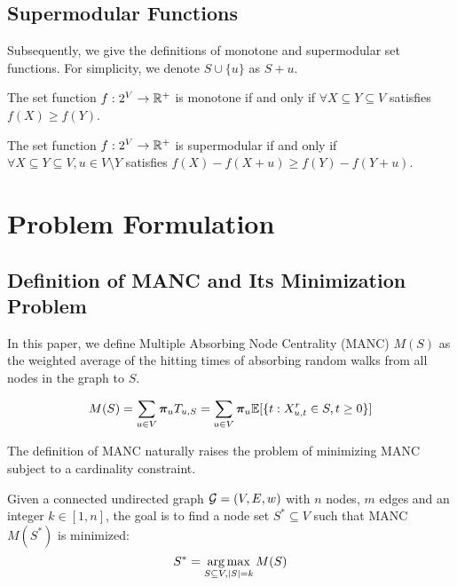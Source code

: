 \documentclass[sigconf]{acmart}
\begin{document}
\subsection{Supermodular Functions}

Subsequently, we give the definitions of monotone and supermodular set functions. For simplicity, we denote \(S\cup\{u\}\) as \(S+u\).

\begin{definition}[Monotonicity]
    The set function \(f:2^{V}\to\mathbb{R}^+\) is monotone if and only if \(\forall X\subseteq Y\subseteq V\) satisfies \(f(X)\ge f(Y)\).
\end{definition}

\begin{definition}[Supermodularity]
    The set function \(f:2^{V}\to\mathbb{R}^+\) is supermodular if and only if \(\forall X\subseteq Y\subseteq V, u\in V\setminus Y\) satisfies \(f(X)-f(X+u)\ge f(Y)-f(Y+u)\).
\end{definition}

\section{Problem Formulation}

\subsection{Definition of MANC and Its Minimization Problem}

In this paper, we define Multiple Absorbing Node Centrality (MANC) \(M(S)\) as the weighted average of the hitting times of absorbing random walks from all nodes in the graph to \(S\).

\begin{definition}[MANC]
    \[M(S)=\sum_{u\in V}\boldsymbol{\pi}_u T_{u,S}=\sum_{u\in V}\boldsymbol{\pi}_u \mathbb{E}[\{t:X_{u,t}^r\in S,t\ge0\}]\]
\end{definition}

The definition of MANC naturally raises the problem of minimizing MANC subject to a cardinality constraint.

\begin{problem}
Given a connected undirected graph \(\mathcal{G}=(V,E,w)\) with \(n\) nodes, \(m\) edges and an integer \(k\in[1,n]\), the goal is to find a node set \(S^*\subseteq V\) such that MANC \(M(S^*)\) is minimized:
\[S^*=\operatorname*{arg\,max}_{S\subseteq V,\left|S \right|=k}M(S)\]
\end{problem}
\end{document}
